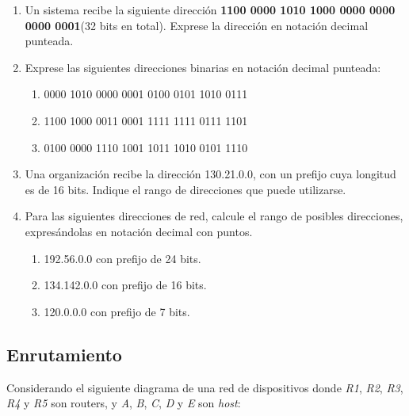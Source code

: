 \documentclass[12pt]{article}
\begin{document}
\begin{enumerate}

    \item Un sistema recibe la siguiente dirección \textbf{1100 0000 1010 1000
        0000 0000 0000 0001}(32 bits en total). Exprese la dirección en
        notación decimal punteada.

    \item Exprese las siguientes direcciones binarias en notación decimal
        punteada:

    \begin{enumerate}

        \item 0000 1010 0000 0001 0100 0101 1010 0111

        \item 1100 1000 0011 0001 1111 1111 0111 1101

        \item 0100 0000 1110 1001 1011 1010 0101 1110

    \end{enumerate}

    \item Una organización recibe la dirección 130.21.0.0, con un prefijo cuya
        longitud es de 16 bits. Indique el rango de direcciones que puede
        utilizarse.

    \item Para las siguientes direcciones de red, calcule el rango de posibles
        direcciones, expresándolas en notación decimal con puntos.

    \begin{enumerate}

        \item 192.56.0.0 con prefijo de 24 bits.

        \item 134.142.0.0 con prefijo de 16 bits.

        \item 120.0.0.0 con prefijo de 7 bits.

    \end{enumerate}

\end{enumerate}

\subsection*{Enrutamiento}

Considerando el siguiente diagrama de una red de dispositivos donde \emph{R1},
\emph{R2}, \emph{R3}, \emph{R4} y \emph{R5} son routers, y \emph{A}, \emph{B},
\emph{C}, \emph{D} y \emph{E} son \emph{host}:
\end{document}

